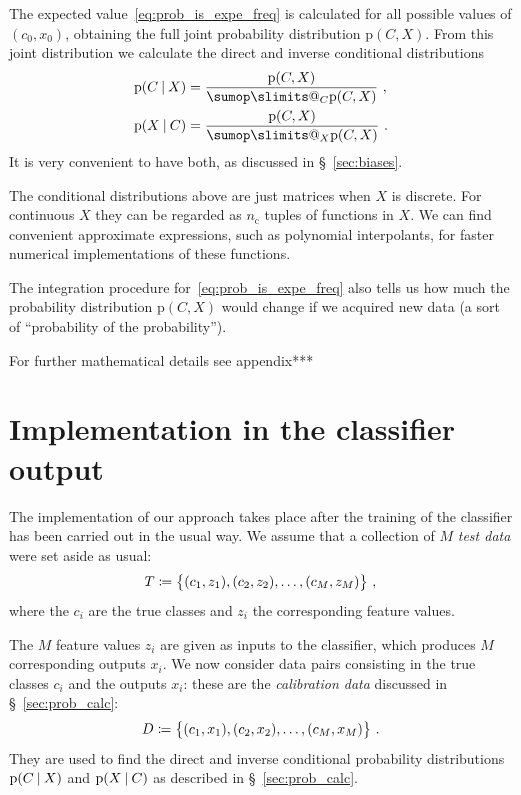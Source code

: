\documentclass[\ifafour a4paper,12pt,\else a5paper,10pt,\fi%
onecolumn,oneside,article,%
british%
]{memoir}
\makeatletter
\theoremstyle{remark}
\theoremstyle{innote}
\def\sum{\DOTSI\sumop\slimits@}
\newcommand*{\defd}{\coloneqq}
\DeclarePairedDelimiter\set{\{}{\}} %
\newcommand*{\p}{\mathrm{p}}%
\renewcommand*{\|}[1][]{\nonscript\:#1\vert\nonscript\:\mathopen{}}
\newcommand*{\sect}{\S}%
\newcommand*{\nc}{n_{\textrm{c}}}
\makeatother
\begin{document}
The expected value~\eqref{eq:prob_is_expe_freq} is calculated for all possible values of $(c_{0}, x_{0})$, obtaining the full joint probability distribution $\p(C, X)$. From this joint distribution we calculate the direct and inverse conditional distributions
\begin{align}
  \label{eq:conditional_direct}
  \p(C \| X) &= \frac{\p(C, X)}{\sum_{C} \p(C, X)} \ , \\
  \label{eq:conditional_inverse}
  \p(X \| C) &= \frac{\p(C, X)}{\sum_{X} \p(C, X)} \ .
\end{align}
It is very convenient to have both, as discussed in \sect~\ref{sec:biases}.

The conditional distributions above are just matrices when $X$ is discrete. For continuous $X$ they can be regarded as $\nc$ tuples of functions in $X$. We can find convenient approximate expressions, such as polynomial interpolants, for faster numerical implementations of these functions.

The integration procedure for~\eqref{eq:prob_is_expe_freq} also tells us how much the probability distribution $\p(C, X)$ would change if we acquired new data (a sort of \enquote{probability of the probability}).

For further mathematical details see appendix***

\section{Implementation in the classifier output}
\label{sec:implem_idea}

The implementation of our approach takes place after the training of the classifier has been carried out in the usual way. We assume that a collection of $M$ \emph{test data} were set aside as usual:
\begin{equation}
  \label{eq:testdata_features}
  T \defd \set[\big]{(c_{1}, z_{1}), (c_{2}, z_{2}), \dotsc, (c_{M}, z_{M})} \ ,
\end{equation}
where the $c_{i}$ are the true classes and $z_{i}$ the corresponding feature values.

The $M$ feature values $z_{i}$ are given as inputs to the classifier, which produces $M$ corresponding outputs $x_{i}$. We now consider data pairs consisting in the true classes $c_{i}$ and the outputs $x_{i}$: these are the \emph{calibration data} discussed in \sect~\ref{sec:prob_calc}:
\begin{equation*}
  D \defd \set[\big]{(c_{1}, x_{1}), (c_{2}, x_{2}), \dotsc, (c_{M}, x_{M}) } \ .
\end{equation*}
They are used to find the direct and inverse conditional probability distributions $\p(C \| X)$ and $\p(X \| C)$ as described in \sect~\ref{sec:prob_calc}.
\end{document}
